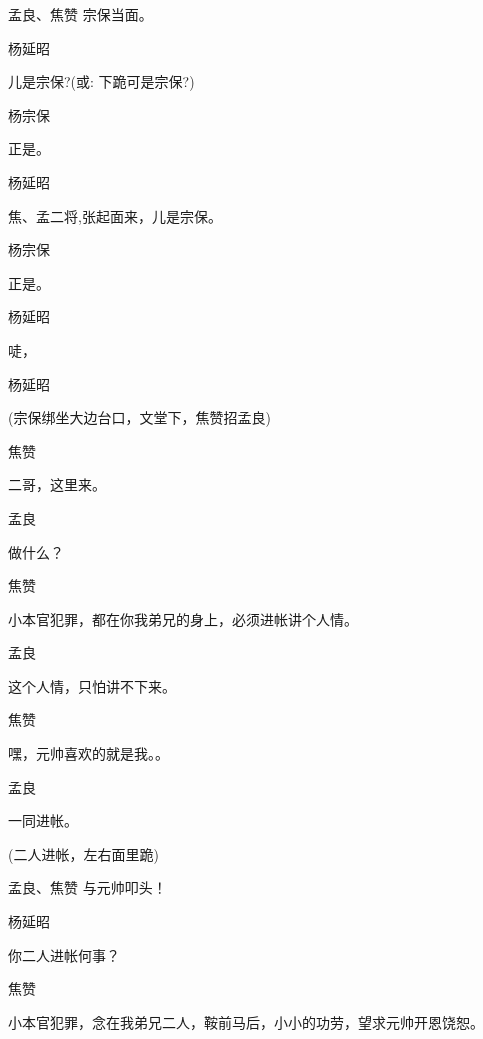 {孟良、焦赞 宗保当面。

杨延昭\hspace{20pt}~

儿是宗保?({\akai 或}: 下跪可是宗保?)

杨宗保\hspace{20pt}~

正是。

杨延昭\hspace{20pt}~

焦、孟二将,张起面来，儿是宗保。

杨宗保\hspace{20pt}~

正是。

杨延昭\hspace{20pt}~

唗，

杨延昭


(宗保绑坐大边台口，文堂下，焦赞招孟良)

焦赞\hspace{30pt}~

二哥，这里来。

孟良\hspace{30pt}~

做什么？

焦赞\hspace{30pt}~

小本官犯罪，都在你我弟兄的身上，必须进帐讲个人情。

孟良\hspace{30pt}~

这个人情，只怕讲不下来。

焦赞\hspace{30pt}~

嘿，元帅喜欢的就是我。。

孟良\hspace{30pt}~

一同进帐。

(二人进帐，左右面里跪)

孟良、焦赞 与元帅叩头！

杨延昭\hspace{20pt}~

你二人进帐何事？

焦赞

小本官犯罪，念在我弟兄二人，鞍前马后，小小的功劳，望求元帅开恩饶恕。

}
